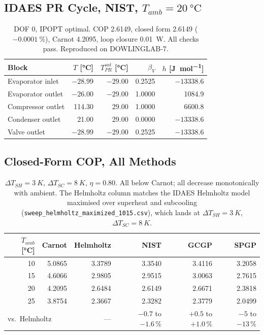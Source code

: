 \documentclass{article}
\begin{document}
\subsection{IDAES PR Cycle, NIST, $T_{amb}=\SI{20}{\celsius}$}
\begin{table}[h]
\centering
\begin{tabular}{lrrrr}
\toprule
Block & $T$ [\si{\celsius}] & $T^{sat}_{PR}$ [\si{\celsius}] & $\beta_V$ & $h$ [\si{\joule\per\mole}] \\
\midrule
Evaporator inlet & $-28.99$ & $-29.00$ & 0.2525 & $-13338.6$ \\
Evaporator outlet & $-26.00$ & $-29.00$ & 1.0000 & 1084.9 \\
Compressor outlet & 114.30 & 29.00 & 1.0000 & 6600.8 \\
Condenser outlet & 21.00 & 29.00 & 0.0000 & $-13338.6$ \\
Valve outlet & $-28.99$ & $-29.00$ & 0.2525 & $-13338.6$ \\
\bottomrule
\end{tabular}
\caption{DOF 0, IPOPT optimal. COP 2.6149, closed form 2.6149
($\SI{-0.0001}{\percent}$), Carnot 4.2095, loop closure \SI{0.01}{W}. All
checks pass. Reproduced on DOWLINGLAB-7.}
\end{table}

\subsection{Closed-Form COP, All Methods}
\begin{table}[h]
\centering
\begin{tabular}{rrrrrr}
\toprule
$T_{amb}$ [\si{\celsius}] & Carnot & Helmholtz & NIST & GCGP & SPGP \\
\midrule
10 & 5.0865 & 3.3789 & 3.3540 & 3.4116 & 3.2058 \\
15 & 4.6066 & 2.9805 & 2.9515 & 3.0063 & 2.7615 \\
20 & 4.2095 & 2.6484 & 2.6149 & 2.6671 & 2.3818 \\
25 & 3.8754 & 2.3667 & 2.3282 & 2.3779 & 2.0499 \\
\midrule
\multicolumn{2}{l}{vs.\ Helmholtz} & --- & $-0.7$ to $-1.6\,\%$ & $+0.5$ to $+1.0\,\%$ & $-5$ to $-13\,\%$ \\
\bottomrule
\end{tabular}
\caption{$\Delta T_{SH}=\SI{3}{K}$, $\Delta T_{SC}=\SI{8}{K}$, $\eta=0.80$.
All below Carnot; all decrease monotonically with ambient. The Helmholtz
column matches the IDAES Helmholtz model maximised over superheat and
subcooling (\texttt{sweep\_helmholtz\_maximized\_1015.csv}), which lands at
$\Delta T_{SH}=\SI{3}{K}$, $\Delta T_{SC}=\SI{8}{K}$.}
\end{table}
\end{document}
